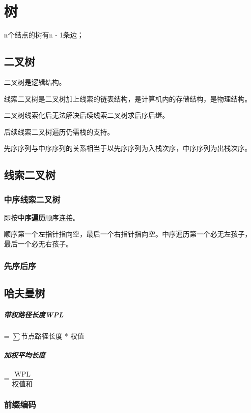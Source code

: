 
\chapter{树}
n个结点的树有n - 1条边；


\section{二叉树}

二叉树是逻辑结构。

线索二叉树是二叉树加上线索的链表结构，是计算机内的存储结构，是物理结构。

二叉树线索化后无法解决后续线索二叉树求后序后继。

后续线索二叉树遍历仍需栈的支持。


先序序列与中序序列的关系相当于以先序序列为入栈次序，中序序列为出栈次序。


\section{线索二叉树}

\subsection{中序线索二叉树}
即按\textbf{中序遍历}顺序连接。

顺序第一个左指针指向空，最后一个右指针指向空。中序遍历第一个必无左孩子，最后一个必无右孩子。


\subsection{先序后序}


\section{哈夫曼树}

\paragraph{带权路径长度WPL}
 = \(\sum\)节点路径长度 * 权值

\paragraph{加权平均长度}
 = \(\dfrac{\text{WPL}}{\text{权值和}}\)

\subsection{前缀编码}

